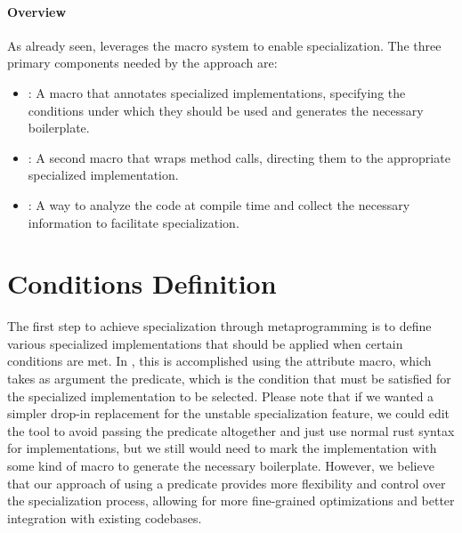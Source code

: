 \paragraph{Overview}
As already seen, \mytool{} leverages the macro system to enable specialization.
The three primary components needed by the approach are:
\begin{itemize}
	\item \textbf{}: A macro that annotates specialized implementations, specifying the conditions under which they should be used and generates the necessary boilerplate.
	\item \textbf{}: A second macro that wraps method calls, directing them to the appropriate specialized implementation.
	\item \textbf{}: A way to analyze the code at compile time and collect the necessary information to facilitate specialization.
\end{itemize}


\section{Conditions Definition}\label{sec:conditions_definition}
The first step to achieve specialization through metaprogramming is to define various specialized implementations that should be applied when certain conditions are met.
In \mytool{}, this is accomplished using the  attribute macro, which takes as argument the predicate, which is the condition that must be satisfied for the specialized implementation to be selected.
Please note that if we wanted a simpler drop-in replacement for the unstable specialization feature, we could edit the tool to avoid passing the predicate altogether and just use normal rust syntax for implementations, but we still would need to mark the implementation with some kind of macro to generate the necessary boilerplate.
However, we believe that our approach of using a predicate provides more flexibility and control over the specialization process, allowing for more fine-grained optimizations and better integration with existing codebases.

